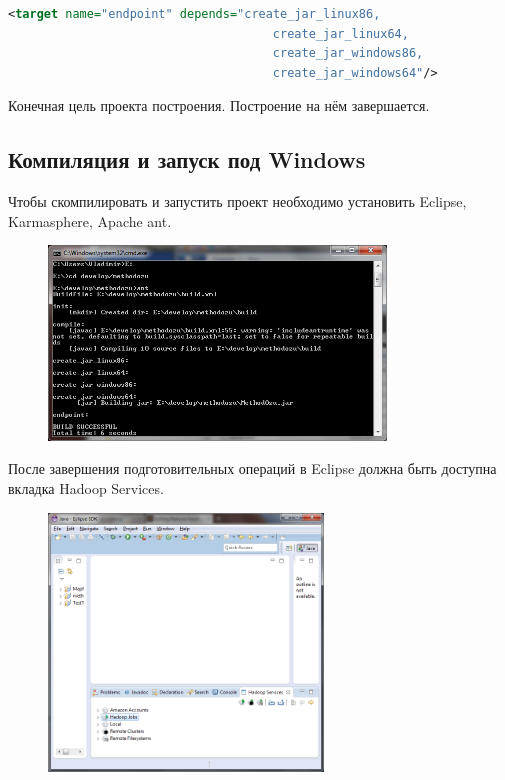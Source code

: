 \documentclass[12pt,a4paper]{extarticle} %
\begin{document}
\newpage
\begin{lstlisting}[language=xml]
    <target name="endpoint" depends="create_jar_linux86,
                                     create_jar_linux64, 
                                     create_jar_windows86, 
                                     create_jar_windows64"/>
\end{lstlisting}

    Конечная цель проекта построения. Построение на нём завершается.


\newpage
\subsection{Компиляция и запуск под Windows}
    Чтобы скомпилировать и запустить проект необходимо установить Eclipse, Karmasphere, Apache ant.
\begin{figure}[h]
    \centering
    \includegraphics[width=0.8\textwidth]{images/windows-compile.png}
\end{figure}

    После завершения подготовительных операций в Eclipse должна быть доступна вкладка Hadoop Services.
\begin{figure}[h]
    \centering
    \includegraphics[width=0.65\textwidth]{images/eclipse-hadoop-services.png}
\end{figure}
\end{document}
